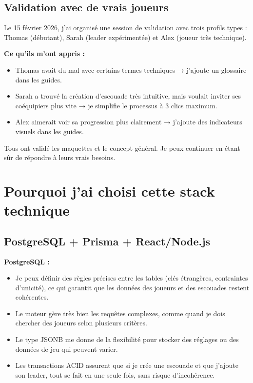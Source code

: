 \subsection*{Validation avec de vrais joueurs}

Le 15 février 2026, j'ai organisé une session de validation avec trois profils types : Thomas (débutant), Sarah (leader expérimentée) et Alex (joueur très technique).

\textbf{Ce qu'ils m'ont appris :}
\begin{itemize}
    \item Thomas avait du mal avec certains termes techniques → j'ajoute un glossaire dans les guides.
    \item Sarah a trouvé la création d'escouade très intuitive, mais voulait inviter ses coéquipiers plus vite → je simplifie le processus à 3 clics maximum.
    \item Alex aimerait voir sa progression plus clairement → j'ajoute des indicateurs visuels dans les guides.
\end{itemize}

Tous ont validé les maquettes et le concept général. Je peux continuer en étant sûr de répondre à leurs vrais besoins.

\section{Pourquoi j'ai choisi cette stack technique}

\subsection*{PostgreSQL + Prisma + React/Node.js}

\textbf{PostgreSQL :}
\begin{itemize}
    \item Je peux définir des règles précises entre les tables (clés étrangères, contraintes d'unicité), ce qui garantit que les données des joueurs et des escouades restent cohérentes.
    \item Le moteur gère très bien les requêtes complexes, comme quand je dois chercher des joueurs selon plusieurs critères.
    \item Le type JSONB me donne de la flexibilité pour stocker des réglages ou des données de jeu qui peuvent varier.
    \item Les transactions ACID assurent que si je crée une escouade et que j'ajoute son leader, tout se fait en une seule fois, sans risque d'incohérence.
\end{itemize}

